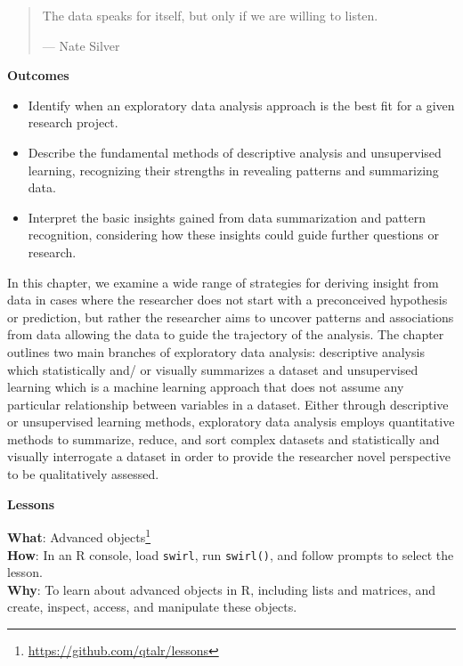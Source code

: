 \documentclass[
  letterpaper,
]{latex/krantz}
\providecommand{\tightlist}{%
  \setlength{\itemsep}{0pt}\setlength{\parskip}{0pt}}\usepackage{longtable,booktabs,array}
\theoremstyle{definition}
\theoremstyle{remark}
\DeclareRobustCommand{\href}[2]{#2\footnote{\url{#1}}}
\begin{document}
\begin{quote}
The data speaks for itself, but only if we are willing to listen.

--- Nate Silver
\end{quote}

\begin{tcolorbox}[enhanced jigsaw, toprule=.15mm, breakable, colback=white, opacityback=0, leftrule=.75mm, bottomrule=.15mm, colframe=quarto-callout-color-frame, left=2mm, arc=.35mm, rightrule=.15mm]

\textbf{ Outcomes}

\begin{itemize}
\tightlist
\item
  Identify when an exploratory data analysis approach is the best fit
  for a given research project.
\item
  Describe the fundamental methods of descriptive analysis and
  unsupervised learning, recognizing their strengths in revealing
  patterns and summarizing data.
\item
  Interpret the basic insights gained from data summarization and
  pattern recognition, considering how these insights could guide
  further questions or research.
\end{itemize}

\end{tcolorbox}

In this chapter, we examine a wide range of strategies for deriving
insight from data in cases where the researcher does not start with a
preconceived hypothesis or prediction, but rather the researcher aims to
uncover patterns and associations from data allowing the data to guide
the trajectory of the analysis. The chapter outlines two main branches
of exploratory data analysis: descriptive analysis which statistically
and/ or visually summarizes a dataset and unsupervised learning which is
a machine learning approach that does not assume any particular
relationship between variables in a dataset. Either through descriptive
or unsupervised learning methods, exploratory data analysis employs
quantitative methods to summarize, reduce, and sort complex datasets and
statistically and visually interrogate a dataset in order to provide the
researcher novel perspective to be qualitatively assessed.

\begin{tcolorbox}[enhanced jigsaw, toprule=.15mm, breakable, colback=white, opacityback=0, leftrule=.75mm, bottomrule=.15mm, colframe=quarto-callout-color-frame, left=2mm, arc=.35mm, rightrule=.15mm]

\textbf{ Lessons}

\textbf{What}: \href{https://github.com/qtalr/lessons}{Advanced
objects}\\
\textbf{How}: In an R console, load \texttt{swirl}, run
\texttt{swirl()}, and follow prompts to select the lesson.\\
\textbf{Why}: To learn about advanced objects in R, including lists and
matrices, and create, inspect, access, and manipulate these objects.

\end{tcolorbox}
\end{document}
